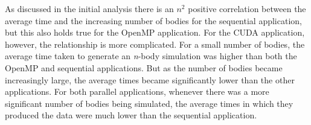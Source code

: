 \documentclass[12pt,journal,transmag]{IEEEtran}
\begin{document}
	\begin{table}[!h]
		\caption{1000 Iterations N-Body Simulation}
		\label{comptable}
		\centering
	\end{table}

	As discussed in the initial analysis there is an $n^2$ positive correlation between the average time and the increasing number of bodies for the sequential application, but this also holds true for the OpenMP application. For the CUDA application, however, the relationship is more complicated. For a small number of bodies, the average time taken to generate an \textit{n}-body simulation was higher than both the OpenMP and sequential applications. But as the number of bodies became increasingly large, the average times became significantly lower than the other applications. For both parallel applications, whenever there was a more significant number of bodies being simulated, the average times in which they produced the data were much lower than the sequential application.
	
\end{document}
